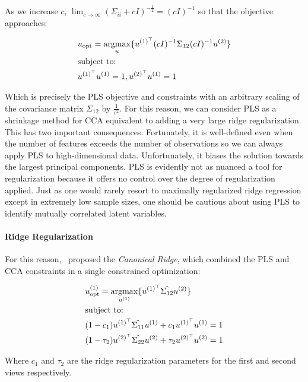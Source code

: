 As we increase $c$, $\lim_{c \to \infty} (\Sigma_{ii}+ c I)^{-\frac{1}{2}}= (c I)^{-1}$ so that the objective approaches:

\begin{align}
     & u_{\text{opt}}=\underset{u}{\mathrm{argmax}}\{ u^{(1)^{\top}}(c I)^{-1}\Sigma_{12}(c I)^{-1}u^{(2)} \} \\
        & \text{subject to:} \notag \\
        & u^{(1)^{\top}}u^{(1)}=1, u^{(2)^{\top}}u^{(1)}=1 \notag
\end{align}

Which is precisely the PLS objective and constraints with an arbitrary scaling of the covariance matrix $\Sigma_{12}$ by $\frac{1}{c^2}$.
For this reason, we can consider PLS as a shrinkage method for CCA equivalent to adding a very large ridge regularization.
This has two important consequences.
Fortunately, it is well-defined even when the number of features exceeds the number of observations so we can always apply PLS to high-dimensional data.
Unfortunately, it biases the solution towards the largest principal components.
PLS is evidently not as nuanced a tool for regularization because it offers no control over the degree of regularization applied.
Just as one would rarely resort to maximally regularized ridge regression except in extremely low sample sizes, one should be cautious about using PLS to identify mutually correlated latent variables.

\paragraph{Ridge Regularization}

For this reason,~\cite{vinod1976canonical} proposed the \textit{Canonical Ridge}, which combined the PLS and CCA constraints in a single constrained optimization:

\begin{align}
     & u^{(1)}_{\text{opt}} = \underset{u^{(1)}}{\mathrm{argmax}} \{ u^{(1)^{\top}} \hat{\Sigma_{12}} u^{(2)} \} \\
     & \text{subject to:} \notag \\
     & (1 - c_1) u^{(1)^{\top}} \hat{\Sigma_{11}} u^{(1)} + c_1 u^{(1)^{\top}} u^{(1)} = 1 \notag \\
     & (1 - \tau_2) u^{(2)^{\top}} \hat{\Sigma_{22}} u^{(2)} + \tau_2 u^{(2)^{\top}} u^{(2)} = 1 \notag
\end{align}

Where $c_1$ and $\tau_2$ are the ridge regularization parameters for the first and second views respectively.

